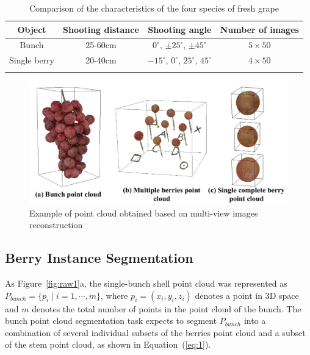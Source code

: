 \documentclass[12pt]{article}
\begin{document}
\begin{table}[h]
    \centering
    \caption{Comparison of the characteristics of the four species of fresh grape}
    \begin{tabular}{cccc}
        \hline
        \textbf{Object} & \textbf{Shooting distance} & \textbf{Shooting angle} & \textbf{Number of images} \\
        \hline
        Bunch        & 25-60cm & $0^{\circ}$, $\pm 25^{\circ}$, $\pm 45^{\circ}$ & $5 \times 50$ \\
        Single berry & 20-40cm & $-15^{\circ}$, $0^{\circ}$, $25^{\circ}$, $45^{\circ}$ & $4 \times 50$ \\
        \hline
    \label{tlb:2}
    \end{tabular}
\end{table}

\begin{figure}[hbt!]
    \centering
    \includegraphics[width=1\textwidth]{figures/Figure4.pdf}
    \caption{Example of point cloud obtained based on multi-view images reconstruction}
    \label{fig:raw10}
\end{figure}

\subsection{Berry Instance Segmentation}

As Figure~\ref{fig:raw1}a, the single-bunch shell point cloud was represented as $P_{bunch}=\{p_i \mid i=1, \cdots, m\}$, where $p_i=(x_i,y_i,z_i)$ denotes a point in 3D space and $m$ denotes the total number of points in the point cloud of the bunch. The bunch point cloud segmentation task expects to segment $P_{bunch}$ into a combination of several individual subsets of the berries point cloud and a subset of the stem point cloud, as shown in Equation~(\ref{eq:1}).
\end{document}
